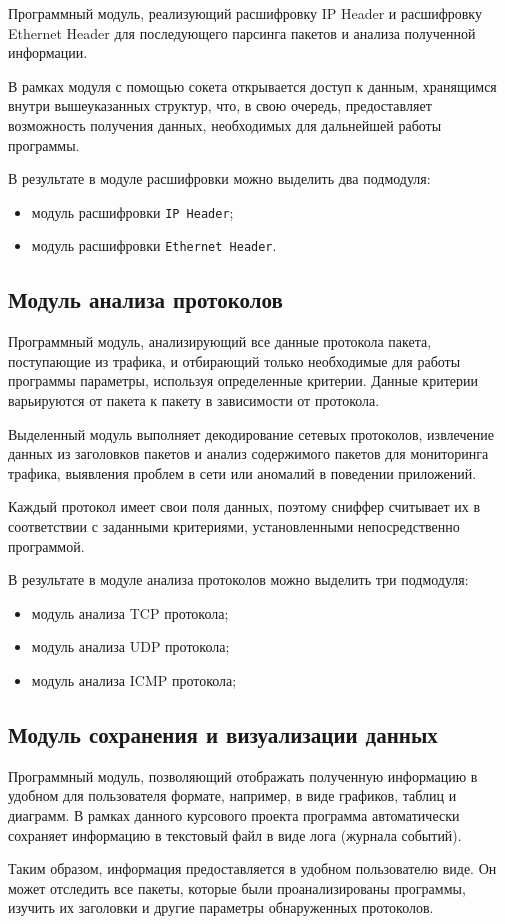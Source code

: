 Программный модуль, реализующий расшифровку IP Header и
расшифровку Ethernet Header для последующего парсинга пакетов и анализа
полученной информации.


В рамках модуля с помощью сокета открывается доступ к данным,
хранящимся внутри вышеуказанных структур, что, в свою очередь,
предоставляет возможность получения данных, необходимых для дальнейшей
работы программы.


В результате в модуле расшифровки можно выделить два подмодуля:
\begin{itemize}
    \item модуль расшифровки \texttt{IP Header};
    \item модуль расшифровки \texttt{Ethernet Header}.
\end{itemize}


\subsection{Модуль анализа протоколов}

Программный модуль, анализирующий все данные протокола пакета,
поступающие из трафика, и отбирающий только необходимые для работы
программы параметры, используя определенные критерии. Данные критерии
варьируются от пакета к пакету в зависимости от протокола.


Выделенный модуль выполняет декодирование сетевых протоколов,
извлечение данных из заголовков пакетов и анализ содержимого пакетов для
мониторинга трафика, выявления проблем в сети или аномалий в поведении
приложений.


Каждый протокол имеет свои поля данных, поэтому сниффер считывает
их в соответствии с заданными критериями, установленными непосредственно
программой.


В результате в модуле анализа протоколов можно выделить три
подмодуля:
\begin{itemize}
    \item модуль анализа TCP протокола;
    \item модуль анализа UDP протокола;
    \item модуль анализа ICMP протокола;
\end{itemize}


\subsection{Модуль сохранения и визуализации данных}

Программный модуль, позволяющий отображать полученную
информацию в удобном для пользователя формате, например, в виде графиков,
таблиц и диаграмм. В рамках данного курсового проекта программа
автоматически сохраняет информацию в текстовый файл в виде лога 
(журнала событий).


Таким образом, информация предоставляется в удобном пользователю
виде. Он может отследить все пакеты, которые были проанализированы
программы, изучить их заголовки и другие параметры обнаруженных
протоколов.
